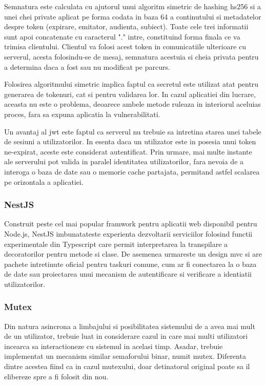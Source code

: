 Semnatura este calculata cu ajutorul unui algoritm simetric de hashing \acrfull{hs256} si a unei chei private aplicat pe forma codata in baza 64 a continutului si metadatelor despre token (expirare, emitator, audienta, subiect). Toate cele trei informatii sunt apoi concatenate cu caracterul "." intre, constituind forma finala ce va trimisa clientului. Clientul va folosi acest token in comunicatiile ulterioare cu serverul, acesta folosindu-se de mesaj, semnatura acestuia si cheia privata pentru a determina daca a fost sau nu modificat pe parcurs.

Folosirea algoritmului simetric implica faptul ca secretul este utilizat atat pentru generarea de tokenuri, cat si pentru validarea lor. In cazul aplicatiei din lucrare, aceasta nu este o problema, deoarece ambele metode ruleaza in interiorul aceluias proces, fara sa expuna aplicatia la vulnerabilitati.

Un avantaj al \acrshort{jwt} este faptul ca serverul nu trebuie sa intretina starea unei tabele de sesiuni a utilizatorilor. In esenta daca un utilizator este in posesia unui token ne-expirat, aceste este considerat autentificat. Prin urmare, mai multe instante ale serverului pot valida in paralel identitatea utilizatorilor, fara nevoia de a interoga o baza de date sau o memorie cache partajata, permitand astfel scalarea pe orizontala a aplicatiei.

\subsubsection {NestJS}

Construit peste cel mai popular framwork pentru aplicatii web disponibil pentru Node.js, NestJS imbunatateste experienta dezvoltarii serviciilor folosind functii experimentale din Typescript care permit interpretarea la transpilare a decoratorilor pentru metode si clase. De asemenea urmareste un design \acrshort{mvc} si are pachete intretinute oficial pentru taskuri comune, cum ar fi conectarea la o baza de date sau proiectarea unui mecanism de autentificare si verificare a identiatii utilizatorilor.

\subsubsection {Mutex}

Din natura asincrona a limbajului si posibilitatea sistemului de a avea mai mult de un utilizator, trebuie luat in considerare cazul in care mai multi utilizatori incearca sa interactioneze cu sistemul in acelasi timp. Asadar, trebuie implementat un mecanism similar semaforului binar, numit mutex. Diferenta dintre acestea fiind ca in cazul mutexului, doar detinatorul original poate sa il elibereze spre a fi folosit din nou.

